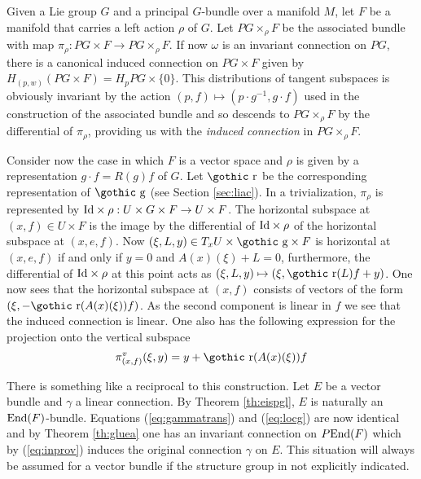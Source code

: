 \documentclass[12pt,titlepage]{article}
\def\goth#1{\hbox{\gothic #1}}
\def\gg{{\goth g}}
\def\gr{{\goth r}}
\def\End{\hbox{End}}
\def\Id{\hbox{Id}}
\begin{document}
Given a Lie group \(G\) and  a principal \(G\)-bundle over a
manifold \(M\), let \(F\) be a manifold that carries a left
action \(\rho\) of \(G\).  Let \(PG\times_\rho F\) be the
associated bundle with map \(\pi_\rho: PG \times F \to PG \times_\rho
F\).
If now \(\omega\) is an invariant connection on
\(PG\), there is a canonical induced connection on \linebreak
\(PG\times F\) given
by \(H_{(p,w)}(PG\times F) = H_pPG \times \{0\}\). This distributions of
tangent subspaces is obviously invariant by the action \((p,f) \mapsto
(p\cdot g^{-1}, g\cdot f)\) used in the construction of the associated
bundle and so descends
to \(PG\times_\rho F\) by the differential of \(\pi_\rho\),
providing us with the {\em induced
connection\/}
%
in \(PG \times_\rho F\).

Consider now the case in which \(F\) is a vector
space and \(\rho\) is given by a representation \(g\cdot f = R(g)f\) of
\(G\). Let \(\gr\) be the corresponding representation of \(\gg\) (see
Section \ref{sec:liac}).
In a  trivialization, \(\pi_\rho\) is represented by
\(\Id\times\rho: U \times G \times F \to U \times F\).
The horizontal subspace at \((x,f) \in U\times F\) is the image by the
differential of \(\Id\times\rho\) of the horizontal subspace at
\((x,e,f)\). Now \((\xi, L, y) \in T_xU\times \gg \times F\) is
horizontal at \((x,e,f)\) if and only if \(y=0\) and
\(A (x)(\xi)+L = 0\),
furthermore, the differential of \(\Id\times\rho\) at this point acts as
\((\xi,L,y) \mapsto (\xi,\gr(L)f + y)\). One now sees that the
horizontal subspace at \((x,f)\) consists of vectors of the form \((\xi,
-\gr(A (x)(\xi))f)\). As the second component is linear in \(f\)
we see that the induced connection is linear. One also has the following
expression for the projection onto the vertical subspace
\begin{equation}\label{eq:inprov}
\pi^v_{(x,f)}(\xi, y) = y+\gr(A (x)(\xi))f
\end{equation}%

There is something like a reciprocal to this construction. Let \(E\) be
a vector bundle  and \(\gamma\) a linear
connection. By Theorem \ref{th:eispgl}, \(E\) is naturally an 
\(\End(F)\)-bundle. Equations (\ref{eq:gammatrans}) and (\ref{eq:locg})
are now identical and by Theorem \ref{th:gluea} one has an invariant
connection on \(P\End(F)\) which by (\ref{eq:inprov}) induces the 
original connection \(\gamma\) on \(E\). This situation will always be
assumed for a vector bundle if the structure group in not explicitly
indicated. 
\end{document}
